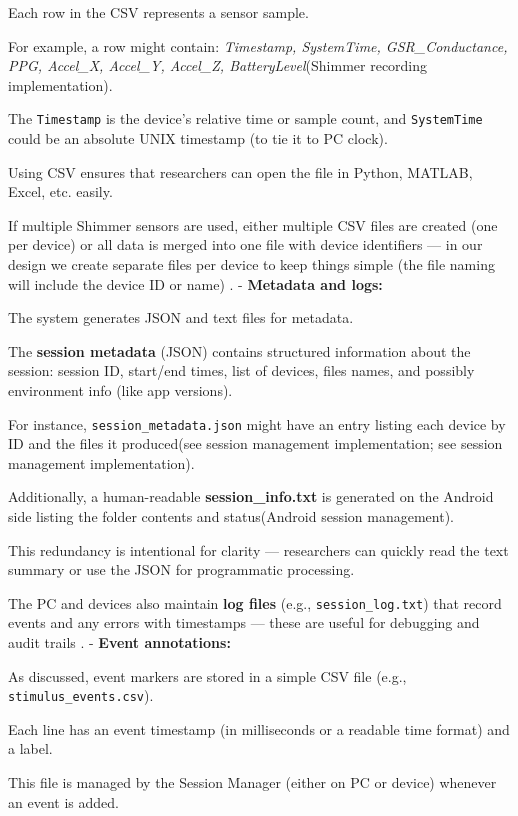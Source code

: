 Each row in the CSV represents a sensor sample.

For example, a row might contain: \textit{Timestamp, SystemTime, GSR\_Conductance, PPG, Accel\_X, Accel\_Y, Accel\_Z, BatteryLevel}(Shimmer recording implementation).

The \texttt{Timestamp} is the device's relative time or sample count, and
\texttt{SystemTime} could be an absolute UNIX timestamp (to tie it to PC clock).

Using CSV ensures that researchers can open the file in Python, MATLAB, Excel,
etc. easily.

If multiple Shimmer sensors are used, either multiple CSV files are created (one per device) or all data is merged into one file with device identifiers --- in our design we create separate files per device to keep things simple (the file naming will include the device ID or name)
. - \textbf{Metadata and logs:}

The system generates JSON and text files for metadata.

The \textbf{session metadata}
(JSON) contains structured information about the session: session ID, start/end
times, list of devices, files names, and possibly environment info (like app
versions).

For instance, \texttt{session\_metadata.json} might have an entry listing each
device by ID and the files it produced(see session management implementation;
see session management implementation).

Additionally, a human-readable \textbf{session\_info.txt}
is generated on the Android side listing the folder contents and status(Android
session management).

This redundancy is intentional for clarity --- researchers can quickly read the
text summary or use the JSON for programmatic processing.

The PC and devices also maintain \textbf{log files}
(e.g., \texttt{session\_log.txt}) that record events and any errors with timestamps --- these are useful for debugging and audit trails
. - \textbf{Event annotations:}

As discussed, event markers are stored in a simple CSV file (e.g.,
\texttt{stimulus\_events.csv}).

Each line has an event timestamp (in milliseconds or a readable time format) and
a label.

This file is managed by the Session Manager (either on PC or device) whenever an
event is added.


